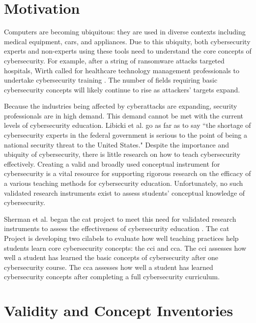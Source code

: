 \section{Motivation}

Computers are becoming ubiquitous: they are used in diverse contexts including medical equipment, cars, and appliances. Due to this ubiquity, both cybersecurity experts and non-experts using these tools need to understand the core concepts of cybersecurity. For example, after a string of ransomware attacks targeted hospitals, Wirth called for healthcare technology management professionals to undertake cybersecurity training \cite{htm, ransomware}. The number of fields requiring basic cybersecurity concepts will likely continue to rise as attackers' targets expand.

Because the industries being affected by cyberattacks are expanding, security professionals are in high demand. This demand cannot be met with the current levels of cybersecurity education. Libicki et al. \cite{hackers_wanted} go as far as to say ``the shortage of cybersecurity experts in the federal government is serious to the point of being a national security threat to the United States." Despite the importance and ubiquity of cybersecurity, there is little research on how to teach cybersecurity effectively. Creating a valid and broadly used conceptual instrument for cybersecurity is a vital resource for supporting rigorous research on the efficacy of a various teaching methods for cybersecurity education. Unfortunately, no such validated research instruments exist to assess students' conceptual knowledge of cybersecurity. 

Sherman et al. began the \gls{cat} project to meet this need for validated research instruments to assess the effectiveness of cybersecurity education \cite{delphi, misconceptions, scenarios, jcerp, status, hackathon}. The \gls{cat} Project is developing two \glspl{cilabel} to evaluate how well teaching practices help students learn core cybersecurity concepts: the \gls{cci} and \gls{cca}. The \gls{cci} assesses how well a student has learned the basic concepts of cybersecurity after one cybersecurity course. The \gls{cca} assesses how well a student has learned cybersecurity concepts after completing a full cybersecurity curriculum.

\section{Validity and Concept Inventories}

